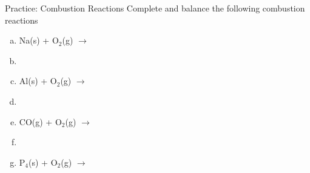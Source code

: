 \documentclass[11pt]{beamer}
\begin{document}
\begin{frame}{Practice: Combustion Reactions}
  Complete and balance the following combustion reactions
  \begin{enumerate}[(a)]
  \item Na(s) + O$_2$(g) $\rightarrow$
  \item[]
  \item Al(s) + O$_2$(g) $\rightarrow$
  \item[]
  \item CO(g) + O$_2$(g) $\rightarrow$
  \item[]
  \item P$_4$(s) + O$_2$(g) $\rightarrow$
  \end{enumerate}  
\end{frame}
\end{document}

